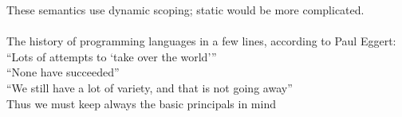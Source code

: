 \documentclass[../../lecture_notes.tex]{subfiles}
\begin{document}
\noindent These semantics use dynamic scoping; static would be more complicated.\\
\\
The history of programming languages in a few lines, according to Paul Eggert:\\
	\indent “Lots of attempts to ‘take over the world’”\\
	\indent “None have succeeded”\\
	\indent “We still have a lot of variety, and that is not going away”\\
	Thus we must keep always the basic principals in mind
\end{document}
